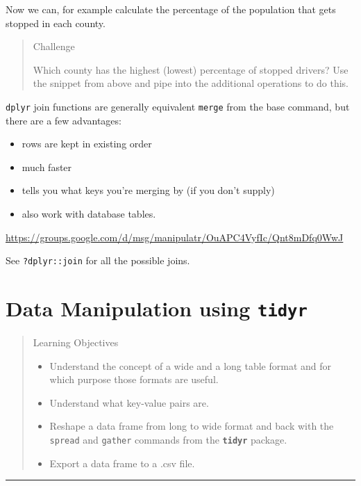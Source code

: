 \documentclass[]{book}
\providecommand{\tightlist}{%
  \setlength{\itemsep}{0pt}\setlength{\parskip}{0pt}}
\begin{document}
Now we can, for example calculate the percentage of the population that gets stopped in each county.

\begin{quote}
Challenge

Which county has the highest (lowest) percentage of stopped drivers?
Use the snippet from above and pipe into the additional operations
to do this.
\end{quote}

\texttt{dplyr} join functions are generally equivalent \texttt{merge} from the base command, but there are a few advantages:

\begin{itemize}
\tightlist
\item
  rows are kept in existing order
\item
  much faster
\item
  tells you what keys you're merging by (if you don't supply)
\item
  also work with database tables.
\end{itemize}

\url{https://groups.google.com/d/msg/manipulatr/OuAPC4VyfIc/Qnt8mDfq0WwJ}

See \texttt{?dplyr::join} for all the possible joins.

\hypertarget{tidyr}{%
\chapter{\texorpdfstring{Data Manipulation using \textbf{\texttt{tidyr}}}{Data Manipulation using tidyr}}\label{tidyr}}

\begin{quote}
Learning Objectives

\begin{itemize}
\tightlist
\item
  Understand the concept of a wide and a long table format and for which purpose those formats are useful.
\item
  Understand what key-value pairs are.
\item
  Reshape a data frame from long to wide format and back with the \texttt{spread} and \texttt{gather} commands from the \textbf{\texttt{tidyr}} package.
\item
  Export a data frame to a .csv file.
\end{itemize}
\end{quote}

\begin{center}\rule{0.5\linewidth}{\linethickness}\end{center}
\end{document}
